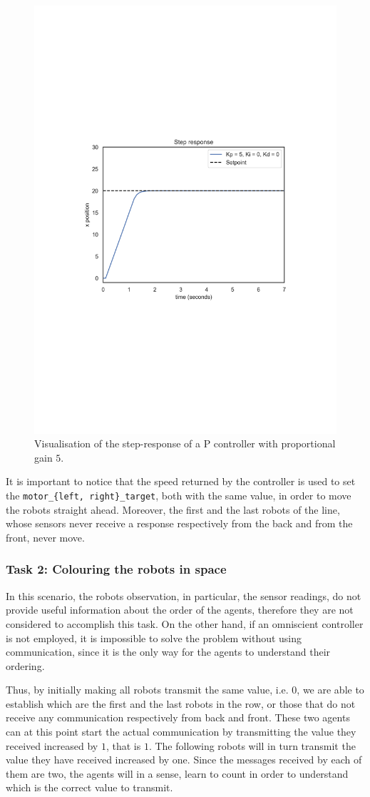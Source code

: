 \begin{figure}[htb]
	\centering
	\includegraphics[width=.5\textwidth]{contents/images/Step-responsep=kp5ki0kd0}
	\caption[Step response of the proportinal PID controller.]{Visualisation of the 
		step-response of a P controller with proportional 
		gain $5$.}
	\label{fig:pid}
\end{figure}

It is important to notice that the speed returned by the controller is used to set the 
\texttt{motor\_\{left, right\}\_target}, both with the same value, in order to move 
the robots straight ahead. Moreover, the first and the last robots of the line, 
whose sensors never receive a response respectively from the back and from the 
front, never move.

\subsubsection{Task 2: Colouring the robots in space}
In this scenario, the robots observation, in particular, the sensor readings, do not 
provide useful information about the order of the agents, therefore they are not 
considered to accomplish this task.
On the other hand, if an omniscient controller is not employed, it is impossible to 
solve the problem without using communication, since it is the only way for the 
agents to understand their ordering.

Thus, by initially making all robots transmit the same value, i.e. $0$, we are able 
to establish which are the first and the last robots in the row, or those that do not 
receive any communication respectively from back and front. 
These two agents can at this point start the actual communication by transmitting 
the value they received increased by $1$, that is $1$. 
The following robots will in turn transmit the value they have received increased 
by one. Since the messages received by each of them are two, the agents will in a 
sense, learn to count in order to understand which is the correct value to 
transmit.

